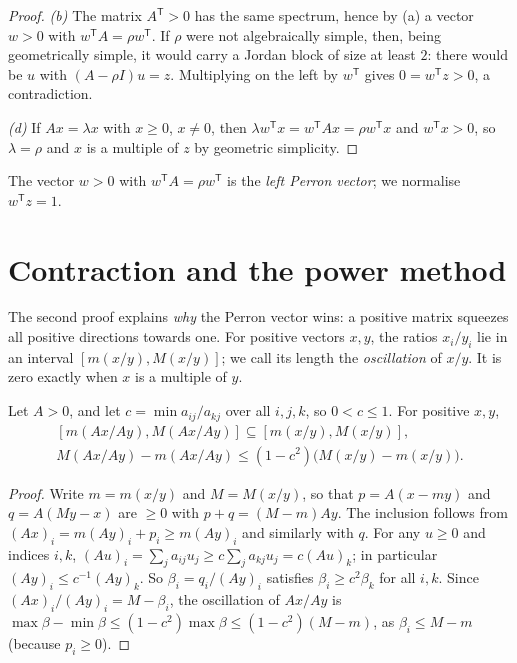 \begin{proof}
\emph{(b)} The matrix $A^{\mathsf T}>0$ has the same spectrum, hence by (a) a vector $w>0$ with $w^{\mathsf T}A=\rho w^{\mathsf
T}$. If $\rho$ were not algebraically simple, then, being geometrically simple, it would carry a Jordan block of size at least
$2$: there would be $u$ with $(A-\rho I)u=z$. Multiplying on the left by $w^{\mathsf T}$ gives $0=w^{\mathsf T}z>0$, a
contradiction.

\emph{(d)} If $Ax=\lambda x$ with $x\ge0$, $x\ne0$, then $\lambda w^{\mathsf T}x=w^{\mathsf T}Ax=\rho w^{\mathsf T}x$ and $w^{\mathsf
T}x>0$, so $\lambda=\rho$ and $x$ is a multiple of $z$ by geometric simplicity.
\end{proof}

The vector $w>0$ with $w^{\mathsf T}A=\rho w^{\mathsf T}$ is the \emph{left Perron vector}; we normalise $w^{\mathsf T}z=1$.

\section{Contraction and the power method}

The second proof explains \emph{why} the Perron vector wins: a positive matrix squeezes all positive directions towards one.
For positive vectors $x,y$, the ratios $x_i/y_i$ lie in an interval $[m(x/y),M(x/y)]$; we call its length the
\emph{oscillation} of $x/y$. It is zero exactly when $x$ is a multiple of $y$.

\begin{lemma}\label{lem:oscillation}
Let $A>0$, and let $c=\min a_{ij}/a_{kj}$ over all $i,j,k$, so $0<c\le1$. For positive $x,y$,
\[
\begin{gathered}
[m(Ax/Ay),M(Ax/Ay)]\subseteq[m(x/y),M(x/y)],\\
M(Ax/Ay)-m(Ax/Ay)\le(1-c^2)\bigl(M(x/y)-m(x/y)\bigr).
\end{gathered}
\]
\end{lemma}
\begin{proof}
Write $m=m(x/y)$ and $M=M(x/y)$, so that $p=A(x-my)$ and $q=A(My-x)$ are $\ge0$ with $p+q=(M-m)Ay$. The inclusion follows from
$(Ax)_i=m(Ay)_i+p_i\ge m(Ay)_i$ and similarly with $q$. For any $u\ge0$ and indices $i,k$, $(Au)_i=\sum_ja_{ij}u_j\ge c\sum_j
a_{kj}u_j=c(Au)_k$; in particular $(Ay)_i\le c^{-1}(Ay)_k$. So $\beta_i=q_i/(Ay)_i$ satisfies $\beta_i\ge c^2\beta_k$ for all
$i,k$. Since $(Ax)_i/(Ay)_i=M-\beta_i$, the oscillation of $Ax/Ay$ is $\max\beta-\min\beta\le(1-c^2)\max\beta\le(1-c^2)(M-m)$,
as $\beta_i\le M-m$ (because $p_i\ge0$).
\end{proof}

